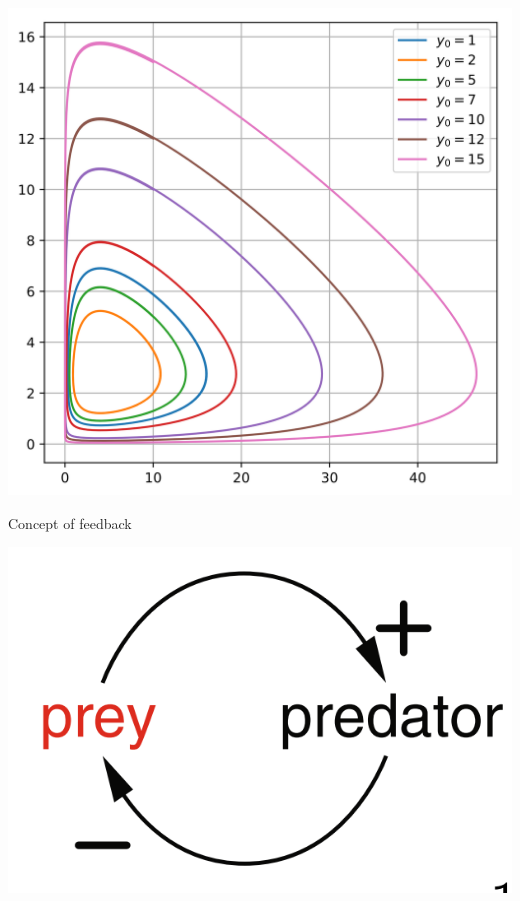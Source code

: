 \begin{frame}
\begin{center}
     \includegraphics[scale = 0.1]{lesson_2/images/predator_prey_space.png}
\end{center}
   
\end{frame}

\begin{frame}{Concept of feedback}
\begin{center}
    \includegraphics[scale = 0.5]{lesson_2/images/predator_feedback.png}
\end{center}
    
\end{frame}

